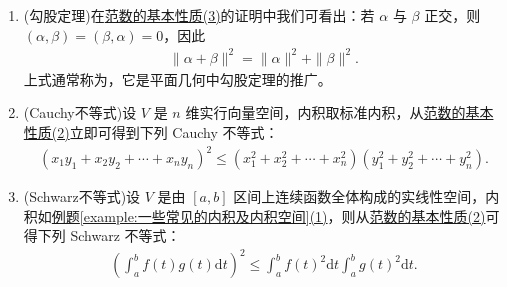 \documentclass[../../main.tex]{subfiles}
\begin{document}
\begin{corollary}\label{corollary:范数性质的相关推广}
\begin{enumerate}
\item\label{corollary:范数性质的相关推广-勾股定理} (勾股定理)在\hyperref[theorem:范数的基本性质]{范数的基本性质(3)}的证明中我们可看出：若 \(\alpha\) 与 \(\beta\) 正交，则 \((\alpha,\beta)=(\beta,\alpha)=0\)，因此
\begin{align*}
\|\alpha + \beta\|^2=\|\alpha\|^2+\|\beta\|^2.
\end{align*}
上式通常称为，它是平面几何中勾股定理的推广。

\item\label{corollary:范数性质的相关推广-Cauchy不等式} (Cauchy不等式)设 \(V\) 是 \(n\) 维实行向量空间，内积取标准内积，从\hyperref[theorem:范数的基本性质]{范数的基本性质(2)}立即可得到下列 Cauchy 不等式：
\begin{align*}
(x_1y_1 + x_2y_2+\cdots + x_ny_n)^2\leq(x_1^2 + x_2^2+\cdots + x_n^2)(y_1^2 + y_2^2+\cdots + y_n^2).
\end{align*}

\item\label{corollary:范数性质的相关推广-Schwarz不等式} (Schwarz不等式)设 \(V\) 是由 \([a,b]\) 区间上连续函数全体构成的实线性空间，内积如\hyperref[example:一些常见的内积及内积空间]{例题\ref{example:一些常见的内积及内积空间}(1)}，则从\hyperref[theorem:范数的基本性质]{范数的基本性质(2)}可得下列 Schwarz 不等式：
\begin{align*}
\left(\int_{a}^{b}f(t)g(t)\mathrm{d}t\right)^2\leq\int_{a}^{b}f(t)^2\mathrm{d}t\int_{a}^{b}g(t)^2\mathrm{d}t.
\end{align*} 
\end{enumerate}
\end{corollary}
\end{document}
